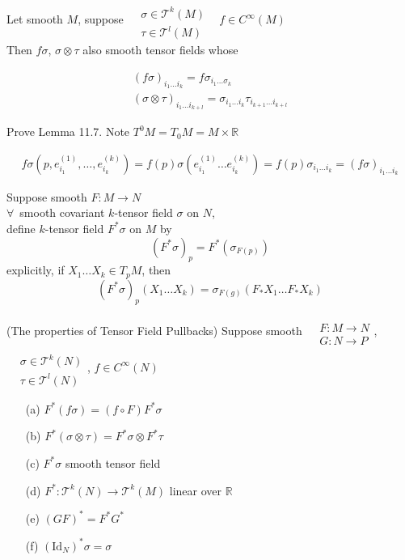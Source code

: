 \begin{lemma}[11.7] Let smooth $M$, suppose $\begin{aligned} & \quad \\ & \sigma \in \mathcal{T}^k(M) \\ & \tau \in \mathcal{T}^l(M) \end{aligned}$ \quad \, $f\in C^{\infty}(M)$  \\

Then $f\sigma$, $\sigma \otimes \tau$ also smooth tensor fields whose 

\[
\begin{gathered}
  (f\sigma)_{i_1 \dots i_k} = f \sigma_{i_1 \dots \sigma_k } \\ 
  (\sigma \otimes \tau)_{i_1 \dots i_{k+l} } = \sigma_{i_1 \dots i_k} \tau_{i_{k+1} \dots i_{k+l} }
\end{gathered}
\]
\end{lemma}


Prove Lemma 11.7.  Note $T^0M = T_0M = M \times \mathbb{R}$

\[
\begin{gathered}
  f\sigma( p, e^{(1)}_{i_1} , \dots , e^{(k)}_{i_k} ) = f(p) \sigma( e^{(1)}_{i_1} \dots e^{(k)}_{i_k} ) = f(p) \sigma_{i_1 \dots i_k} = (f\sigma)_{i_1 \dots i_k}
\end{gathered}
\]


Suppose smooth $F:M \to N$ \\
$\forall \, $ smooth covariant $k$-tensor field $\sigma$ on $N$, \\
define $k$-tensor field $F^*\sigma$ on $M$ by 
\[
(F^* \sigma)_p = F^*(\sigma_{F(p)})
\]
explicitly, if $X_1 \dots X_k \in T_pM$, then
\[
(F^* \sigma)_p(X_1 \dots X_k) = \sigma_{F(g)}(F_* X_1 \dots F_* X_k)
\]


\begin{proposition}[11.9] (The properties of Tensor Field Pullbacks)
Suppose smooth $\begin{aligned} & \quad \\ 
  & F:M \to N \\
  & G:N \to P \end{aligned}$, \quad $\begin{aligned} & \quad \\ 
  & \sigma \in \mathcal{T}^k(N) \\ 
  & \tau \in \mathcal{T}^l(N) \end{aligned}$, \quad $f\in C^{\infty}(N)$ 
\begin{enumerate}
  \item[(a)] $F^*(f\sigma) = (f\circ F) F^* \sigma$
\item[(b)] $F^*(\sigma \otimes \tau) = F^*\sigma \otimes F^*\tau$ 
\item[(c)] $F^*\sigma$ smooth tensor field 
\item[(d)] $F^*:\mathcal{T}^k(N) \to \mathcal{T}^k(M)$ linear over $\mathbb{R}$
\item[(e)] $(GF)^* = F^* G^*$ 
\item[(f)] $(\text{Id}_N)^*\sigma = \sigma$
\end{enumerate}
\end{proposition}

